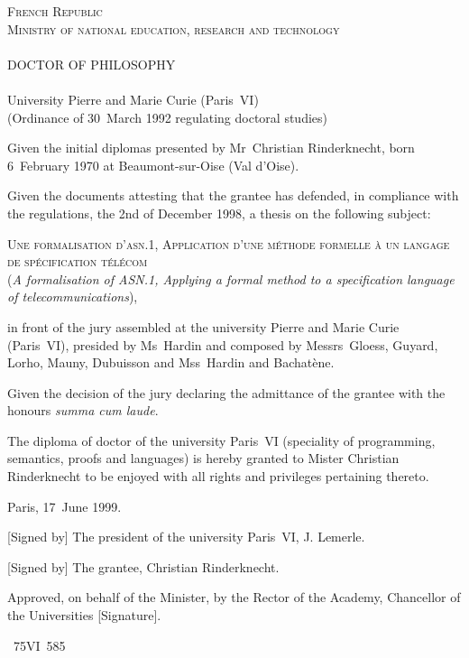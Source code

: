 \documentclass[a4paper,11pt,twoside]{article}
\begin{document}
\begin{center}
\textsc{French Republic}\\
\textsc{Ministry of national education, research and technology}\\
\ \\
\textsc{\Large DOCTOR OF PHILOSOPHY}\\
\ \\
University Pierre and Marie Curie (Paris~VI)\\
(Ordinance of 30~March 1992 regulating doctoral studies)
\end{center}
Given the initial diplomas presented by Mr~Christian Rinderknecht,
born 6~February 1970 at Beaumont-sur-Oise (Val d'Oise).

\medskip

Given the documents attesting that the grantee has defended, in
compliance with the regulations, the 2nd of December 1998, a thesis on
the following subject:
\begin{center}
\textsc{Une formalisation d'asn.1, Application d'une m\'ethode
  formelle \`a un langage de sp\'ecification t\'el\'ecom}\\ (\emph{A
  formalisation of ASN.1, Applying a formal method to a specification
  language of telecommunications}),
\end{center}
in front of the jury assembled at the university Pierre and Marie
Curie (Paris~VI), presided by Ms~Hardin and composed by Messrs~Gloess,
Guyard, Lorho, Mauny, Dubuisson and Mss~Hardin and Bachat\`ene.

\medskip

Given the decision of the jury declaring the admittance of the grantee
with the honours \emph{summa cum laude}.

\medskip

The diploma of doctor of the university Paris~VI (speciality of
programming, semantics, proofs and languages) is hereby granted to
Mister Christian Rinderknecht to be enjoyed with all rights and
privileges pertaining thereto.

\bigskip

Paris, 17~June 1999.

\bigskip

[Signed by] The president of the university Paris~VI, J. Lemerle.

[Signed by] The grantee, Christian Rinderknecht.

Approved, on behalf of the Minister, by the Rector of the Academy,
Chancellor of the Universities [Signature].

\bigskip

\hfill\textnumero~75VI~585

\thispagestyle{empty}
\end{document}
